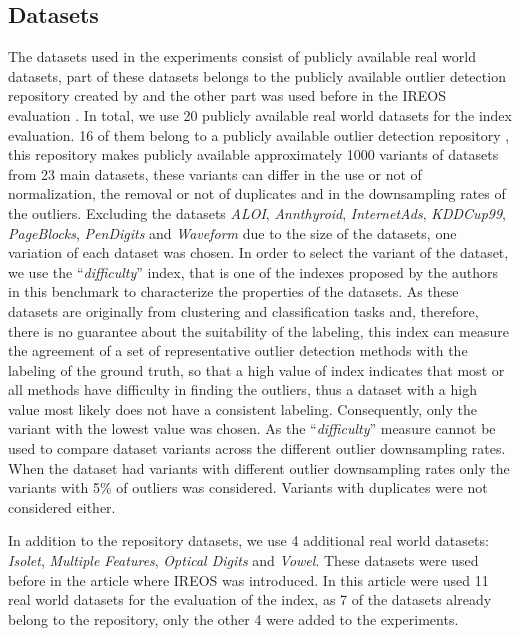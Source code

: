 
\subsection{Datasets}
The datasets used in the experiments consist of publicly available real world datasets, part of these datasets belongs to the publicly available outlier detection repository created by \cite{campos2016} and the other part was used before in the IREOS evaluation \cite{marques2015}. In total, we use 20 publicly available real world datasets for the index evaluation. 16 of them belong to a publicly available outlier detection repository \cite{campos2016}, this repository makes publicly available approximately 1000 variants of datasets from 23 main datasets, these variants can differ in the use or not of normalization, the removal or not of duplicates and in the downsampling rates of the outliers. Excluding the datasets \textit{ALOI}, \textit{Annthyroid}, \textit{InternetAds}, \textit{KDDCup99}, \textit{PageBlocks}, \textit{PenDigits} and \textit{Waveform} due to the size of the datasets, one variation of each dataset was chosen. In order to select the variant of the dataset, we use the ``\textit{difficulty}'' index, that is one of the indexes proposed by the authors in this benchmark to characterize the properties of the datasets. As these datasets are originally from clustering and classification tasks and, therefore, there is no guarantee about the suitability of the labeling, this index can measure the agreement of a set of representative outlier detection methods with the labeling of the ground truth, so that a high value of index indicates that most or all methods have difficulty in finding the outliers, thus a dataset with a high value most likely does not have a consistent labeling. Consequently, only the variant with the lowest value was chosen. As the ``\textit{difficulty}'' measure cannot be used to compare dataset variants across the different outlier downsampling rates. When the dataset had variants with different outlier downsampling rates only the variants with 5\% of outliers was considered. Variants with duplicates were not considered either.

In addition to the repository datasets, we use 4 additional real world datasets: \textit{Isolet}, \textit{Multiple Features}, \textit{Optical Digits} and \textit{Vowel}. These datasets were used before in the article where IREOS was introduced. In this article were used 11 real world datasets for the evaluation of the index, as 7 of the datasets already belong to the repository, only the other 4 were added to the experiments. 

